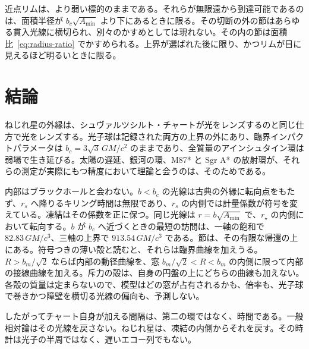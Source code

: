 \documentclass[a4paper]{article}
\begin{document}
近点リムは、より弱い標的のままである。それらが無限遠から到達可能であるのは、面積半径が \(b_c\sqrt{A_{\min}}\) より下にあるときに限る。その切断の外の節はあらゆる貫入光線に横切られ、別々のかすめとしては現れない。その内の節は面積比~\eqref{eq:radius-ratio} でかすめられる。上界が選ばれた後に限り、かつリムが目に見えるほど明るいときに限る。

\section{結論}
\label{sec:conclusion}

ねじれ星の外縁は、シュヴァルツシルト・チャートが光をレンズするのと同じ仕方で光をレンズする。光子球は記録された両方の上界の外にあり、臨界インパクトパラメータは \(b_c=3\sqrt{3}\,GM/c^2\) のままであり、全質量のアインシュタイン環は弱場で生き延びる。太陽の遅延、銀河の環、M87* と Sgr A* の放射環が、それらの測定が実際にもつ精度において理論と会うのは、そのためである。

内部はブラックホールと会わない。\(b<b_c\) の光線は古典の外縁に転向点をもたず、\(r_s\) へ降りるキリング時間は無限であり、\(r_s\) の内側では計量係数が符号を変えている。凍結はその係数を正に保つ。同じ光線は \(r=b\sqrt{A_{\min}}\) で、\(r_\star\) の内側において転向する。\(b\) が \(b_c\) へ近づくときの最短の訪問は、一軸の飽和で \(82.83\,GM/c^3\)、三軸の上界で \(913.54\,GM/c^3\) である。節は、その有限な帰還の上にある。符号つきの薄い殻と読むと、それらは臨界曲線を加えうる。\(R>b_m/\sqrt{2}\) ならば内部の動径曲線を、窓 \(b_m/\sqrt{2}<R<b_m\) の内側に限って内部の接線曲線を加える。斥力の殻は、自身の円盤の上にどちらの曲線も加えない。各殻の質量は定まらないので、模型はどの窓が占有されるかも、倍率も、光子球で巻きかつ障壁を横切る光線の偏向も、予測しない。

したがってチャート自身が加える間隔は、第二の環ではなく、時間である。一般相対論はその光線を戻さない。ねじれ星は、凍結の内側からそれを戻す。その時計は光子の半周ではなく、遅いエコー列でもない。
\end{document}
